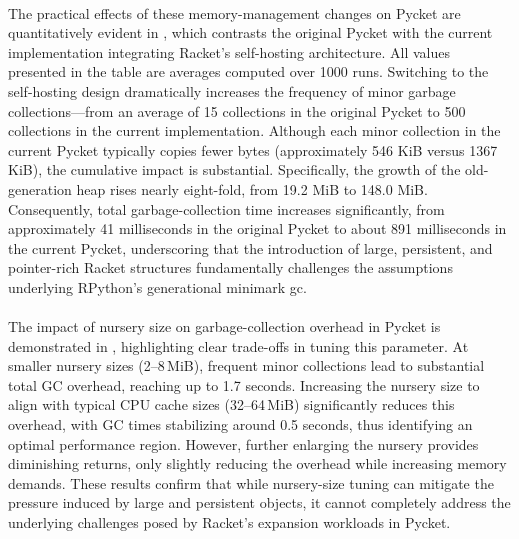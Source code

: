 		\paragraph{}%
			The practical effects of these memory-management changes on Pycket are quantitatively evident in , which contrasts the original Pycket with the current implementation integrating Racket's self-hosting architecture. All values presented in the table are averages computed over 1000 runs. Switching to the self-hosting design dramatically increases the frequency of minor garbage collections—from an average of 15 collections in the original Pycket to 500 collections in the current implementation. Although each minor collection in the current Pycket typically copies fewer bytes (approximately 546 KiB versus 1367 KiB), the cumulative impact is substantial. Specifically, the growth of the old-generation heap rises nearly eight-fold, from 19.2 MiB to 148.0 MiB. Consequently, total garbage-collection time increases significantly, from approximately 41 milliseconds in the original Pycket to about 891 milliseconds in the current Pycket, underscoring that the introduction of large, persistent, and pointer-rich Racket structures fundamentally challenges the assumptions underlying RPython's generational minimark \gls{gc}.


		\paragraph{}%
			The impact of nursery size on garbage-collection overhead in Pycket is demonstrated in , highlighting clear trade-offs in tuning this parameter. At smaller nursery sizes (2--8\,MiB), frequent minor collections lead to substantial total GC overhead, reaching up to 1.7 seconds. Increasing the nursery size to align with typical CPU cache sizes (32--64\,MiB) significantly reduces this overhead, with GC times stabilizing around 0.5 seconds, thus identifying an optimal performance region. However, further enlarging the nursery provides diminishing returns, only slightly reducing the overhead while increasing memory demands. These results confirm that while nursery-size tuning can mitigate the pressure induced by large and persistent objects, it cannot completely address the underlying challenges posed by Racket's expansion workloads in Pycket.





